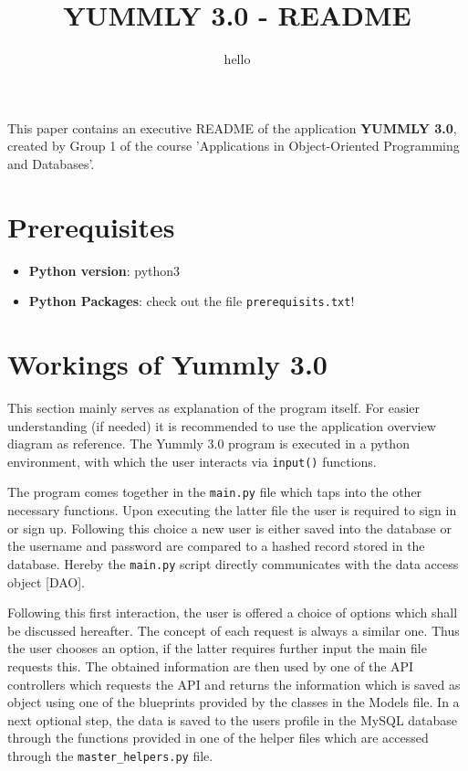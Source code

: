 \documentclass[11pt,a4paper,notitlepage]{article}
\title{YUMMLY 3.0 -  README}
\subtitle{hello}
\date{\vspace{-5ex}}
\author{\vspace{-5ex}}
\begin{document}
\maketitle
\thispagestyle{fancy}

This paper contains an executive README of the application \textbf{YUMMLY 3.0}, created by Group 1 of the course 'Applications in Object-Oriented Programming and Databases'.

\section*{Prerequisites}
\begin{itemize}  
\item\textbf{Python version}: python3
\item \textbf{Python Packages}: check out the file \texttt{prerequisits.txt}!
\end{itemize}
 
\section*{Workings of Yummly 3.0}
This section mainly serves as explanation of the program itself. For easier understanding (if needed) it is recommended to use the application overview diagram as reference. The Yummly 3.0 program is executed in a python environment, with which the user interacts via \texttt{input()} functions.

The program comes together in the \texttt{main.py} file which taps into the other necessary functions.
Upon executing the latter file the user is required to sign in or sign up.
Following this choice a new user is either saved into the database or the username and password are compared to a hashed record stored in the database.
Hereby the \texttt{main.py} script directly communicates with the data access object [DAO].

Following this first interaction, the user is offered a choice of options which shall be discussed hereafter. The concept of each request is always a similar one.
Thus the user chooses an option, if the latter requires further input the main file requests this. The obtained information are then used by one of the API controllers which requests the API and returns the information which is saved as object using one of the blueprints provided by the classes in the Models file.
In a next optional step, the data is saved to the users profile in the MySQL database through the functions provided in one of the helper files which are accessed through the \texttt{master\_helpers.py} file.
\end{document}
